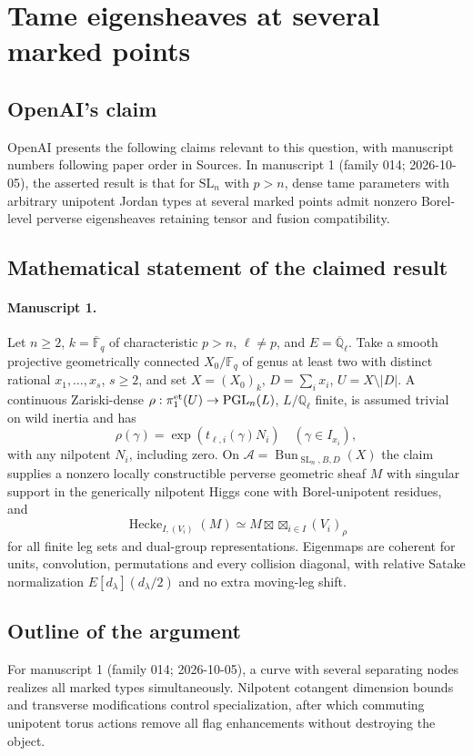 \documentclass[11pt]{article}
\begin{document}
\section*{Tame eigensheaves at several marked points}

\subsection{OpenAI's claim}
OpenAI presents the following claims relevant to this question, with manuscript numbers following paper order in Sources. In manuscript 1 (family 014; 2026-10-05), the asserted result is that for $\mathrm{SL}_n$ with $p>n$, dense tame parameters with arbitrary unipotent Jordan types at several marked points admit nonzero Borel-level perverse eigensheaves retaining tensor and fusion compatibility.

\subsection{Mathematical statement of the claimed result}
\paragraph{Manuscript 1.}
Let $n\ge2$, $k=\overline{\mathbb F}_q$ of characteristic $p>n$, $\ell\ne p$, and $E=\overline{\mathbb Q}_{\ell}$. Take a smooth projective geometrically connected $X_0/\mathbb F_q$ of genus at least two with distinct rational $x_1,\ldots,x_s$, $s\ge2$, and set $X=(X_0)_k$, $D=\sum_ix_i$, $U=X\setminus|D|$. A continuous Zariski-dense $\rho:\pi_1^{\rm et}(U)\to\operatorname{PGL}_n(L)$, $L/\mathbb Q_{\ell}$ finite, is assumed trivial on wild inertia and has
\[
 \rho(\gamma)=\exp(t_{\ell,i}(\gamma)N_i)\quad(\gamma\in I_{x_i}),
\]
with any nilpotent $N_i$, including zero. On $\mathcal A=\operatorname{Bun}_{\operatorname{SL}_n,B,D}(X)$ the claim supplies a nonzero locally constructible perverse geometric sheaf $M$ with singular support in the generically nilpotent Higgs cone with Borel-unipotent residues, and
\[
 \operatorname{Hecke}_{I,(V_i)}(M)\simeq M\boxtimes\mathop{\boxtimes}_{i\in I}(V_i)_{\rho}
\]
for all finite leg sets and dual-group representations. Eigenmaps are coherent for units, convolution, permutations and every collision diagonal, with relative Satake normalization $E[d_{\lambda}](d_{\lambda}/2)$ and no extra moving-leg shift.

\subsection{Outline of the argument}
For manuscript 1 (family 014; 2026-10-05), a curve with several separating nodes realizes all marked types simultaneously. Nilpotent cotangent dimension bounds and transverse modifications control specialization, after which commuting unipotent torus actions remove all flag enhancements without destroying the object.
\end{document}
